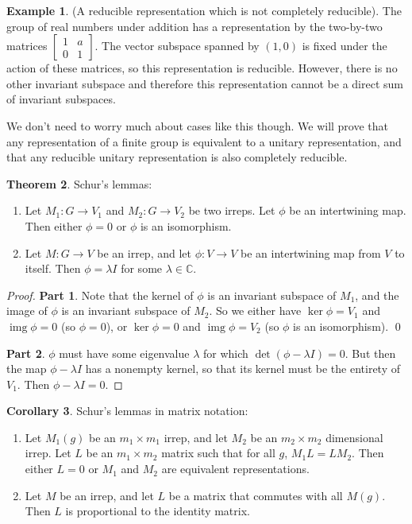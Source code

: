 \documentclass[12pt, letterpaper]{article}
\theoremstyle{definition} %
\newtheorem{thm}{Theorem}[section] %
\newtheorem{cor}[thm]{Corollary}
\newtheorem{ex}[thm]{Example}
\def\img{\operatorname{img}}
\begin{document}
\begin{ex} (A reducible representation which is not completely reducible). The group of real numbers under addition has a representation by the
  two-by-two matrices $\begin{bmatrix} 1 & a \\ 0 & 1\end{bmatrix}$. The vector subspace spanned by $(1,0)$ is fixed under the action of these matrices,
  so this representation is reducible. However, there is no other invariant subspace and therefore this representation cannot be a direct sum of invariant subspaces.

  We don't need to worry much about cases like this though. We will prove that any representation of a finite group is equivalent to a unitary 
  representation, and that any reducible unitary representation is also completely
  reducible.
\end{ex}



\begin{thm}
  Schur's lemmas:
  \begin{enumerate}
    \item Let $M_1:G\to V_1$ and $M_2:G\to V_2$ be two irreps. Let $\phi$ be an intertwining map.
      Then either $\phi=0$ or $\phi$ is an isomorphism.
    \item Let $M:G\to V$ be an irrep, and let $\phi:V\to V$ be an intertwining map from $V$ to itself.
      Then $\phi=\lambda I$ for some $\lambda\in\mathbb{C}$.
  \end{enumerate}
\end{thm}

\begin{proof}
  {\bf Part 1}. Note that the kernel of $\phi$ is an invariant subspace of $M_1$, and the image of $\phi$  is an invariant
  subspace of $M_2$. So we either have $\ker \phi=V_1$ and $\img \phi=0$ (so $\phi=0$), or $\ker \phi=0$ and $\img \phi=V_2$
  (so $\phi$ is an isomorphism). \qed

  {\bf Part 2}. $\phi$ must have some eigenvalue $\lambda$ for which $\det (\phi-\lambda I)=0$. But then the map 
  $\phi-\lambda I$ has a nonempty kernel, so that its kernel must be the entirety of $V_1$. Then $\phi-\lambda I=0$. 
\end{proof}

\begin{cor}
  Schur's lemmas in matrix notation:
  \begin{enumerate}
    \item Let $M_1(g)$ be an $m_1\times m_1$ irrep, and let $M_2$ be an $m_2\times m_2$ dimensional irrep. Let $L$ be an
      $m_1\times m_2$ matrix such that for all $g$, $M_1L=LM_2$. Then either $L=0$ or $M_1$ and $M_2$ are equivalent representations.
    \item Let $M$ be an irrep, and let $L$ be a matrix that commutes with all $M(g)$. Then $L$ is proportional to the identity matrix.
  \end{enumerate}
\end{cor}
\end{document}
